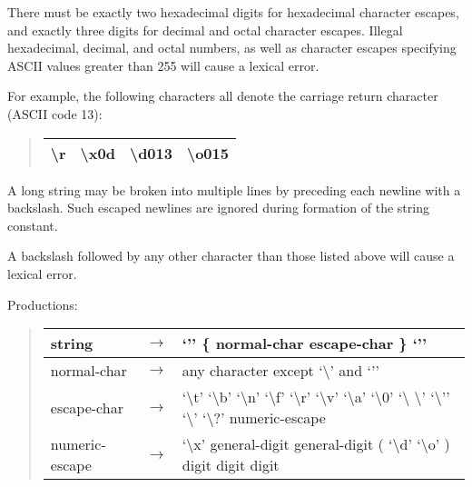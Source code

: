 \documentclass[letterpaper,10pt,english]{sphinxmanual}
\begin{document}
There must be exactly two hexadecimal digits for hexadecimal character escapes, and exactly three
digits for decimal and octal character escapes. Illegal hexadecimal, decimal, and octal numbers, as
well as character escapes specifying ASCII values greater than 255 will cause a lexical error.

For example, the following characters all denote the carriage return character (ASCII code 13):
\begin{quote}

\noindent\begin{tabulary}{\linewidth}{|L|L|L|L|}
\hline

\textbackslash{}r
&
\textbackslash{}x0d
&
\textbackslash{}d013
&
\textbackslash{}o015
\\
\hline\end{tabulary}

\end{quote}

A long string may be broken into multiple lines by preceding each newline with a backslash. Such
escaped newlines are ignored during formation of the string constant.

A backslash followed by any other character than those listed above will cause a lexical error.

Productions:
\begin{quote}

\noindent\begin{tabulary}{\linewidth}{|L|L|L|}
\hline

string
&
\(\rightarrow\)
&
‘’’ \{ normal-char \textbar{} escape-char \} ‘’’
\\
\hline
normal-char
&
\(\rightarrow\)
&
any character except ‘\textbackslash{}’ and ‘’’
\\
\hline
escape-char
&
\(\rightarrow\)
&
‘\textbackslash{}t’ \textbar{} ‘\textbackslash{}b’ \textbar{} ‘\textbackslash{}n’ \textbar{} ‘\textbackslash{}f’ \textbar{} ‘\textbackslash{}r’ \textbar{} ‘\textbackslash{}v’ \textbar{} ‘\textbackslash{}a’ \textbar{} ‘\textbackslash{}0’ \textbar{} ‘\textbackslash{} \textbackslash{}’ \textbar{} ‘\textbackslash{}’’ \textbar{} ‘\textbackslash{}\sphinxquotedblright{}’ \textbar{} ‘\textbackslash{}?’ \textbar{} numeric-escape
\\
\hline
numeric-escape
&
\(\rightarrow\)
&
‘\textbackslash{}x’ general-digit general-digit \textbar{} ( ‘\textbackslash{}d’ \textbar{} ‘\textbackslash{}o’ ) digit digit digit
\\
\hline\end{tabulary}

\end{quote}
\end{document}
